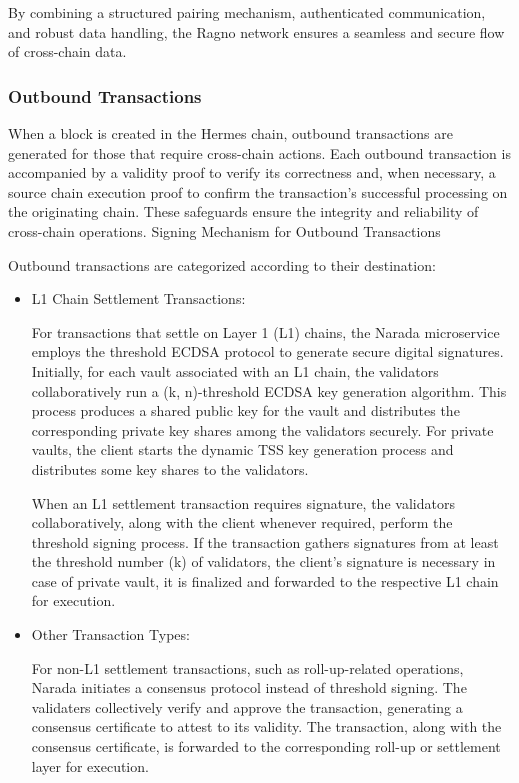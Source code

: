 By combining a structured pairing mechanism, authenticated communication, and robust data handling, the Ragno network ensures a seamless and secure flow of cross-chain data.

\subsubsection{Outbound Transactions}
When a block is created in the Hermes chain, outbound transactions are generated for those that require cross-chain actions. Each outbound transaction is accompanied by a validity proof to verify its correctness and, when necessary, a source chain execution proof to confirm the transaction’s successful processing on the originating chain. These safeguards ensure the integrity and reliability of cross-chain operations.
Signing Mechanism for Outbound Transactions

Outbound transactions are categorized according to their destination:

\begin{itemize}
    \item \textsf{L1 Chain Settlement Transactions:}
    
    For transactions that settle on Layer 1 (L1) chains, the Narada microservice employs the threshold ECDSA protocol to generate secure digital signatures. Initially, for each vault associated with an L1 chain, the validators collaboratively run a (k, n)-threshold ECDSA key generation algorithm. This process produces a shared public key for the vault and distributes the corresponding private key shares among the validators securely. For private vaults, the client starts the dynamic TSS key generation process and distributes some key shares to the validators.
        
    When an L1 settlement transaction requires signature, the validators collaboratively, along with the client whenever required, perform the threshold signing process. If the transaction gathers signatures from at least the threshold number (k) of validators, the client's signature is necessary in case of private vault, it is finalized and forwarded to the respective L1 chain for execution.

    \item \textsf{Other Transaction Types:}

    For non-L1 settlement transactions, such as roll-up-related operations, Narada initiates a consensus protocol instead of threshold signing. The validaters collectively verify and approve the transaction, generating a consensus certificate to attest to its validity. The transaction, along with the consensus certificate, is forwarded to the corresponding roll-up or settlement layer for execution.
\end{itemize}

